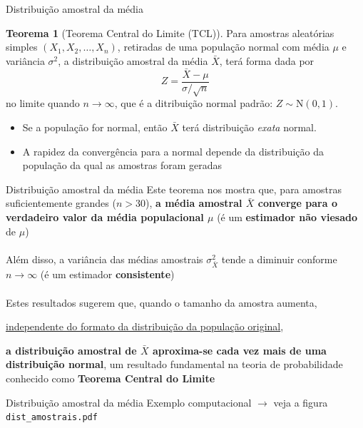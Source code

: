 \documentclass[10pt]{beamer}\usepackage[]{graphicx}\usepackage[]{color}
\providecommand{\N}{\text{N}}
\theoremstyle{definition}
\newtheorem*{mythm}{Teorema}
\begin{document}
\begin{frame}[fragile=singleslide]{Distribuição amostral da média}
  \begin{mythm}[Teorema Central do Limite (TCL)]
    Para amostras aleatórias simples $(X_1, X_2, \ldots, X_n)$,
    retiradas de uma população normal com média $\mu$ e variância
    $\sigma^2$, a distribuição amostral da média $\bar{X}$,
    terá forma dada por
    \begin{equation*}
      Z = \frac{\bar{X} - \mu}{\sigma/\sqrt{n}}
    \end{equation*}
    no limite quando $n \to \infty$, que é a ditribuição normal padrão:
    $Z \sim \N(0,1)$.
  \end{mythm}
  \begin{itemize}
  \item Se a população for normal, então $\bar{X}$ terá distribuição
    \textit{exata} normal.
  \item A rapidez da convergência para a normal depende da distribuição
    da população da qual as amostras foram geradas
  \end{itemize}
\end{frame}


\begin{frame}[fragile=singleslide]{Distribuição amostral da média}
  Este teorema nos mostra que, para amostras suficientemente grandes ($n
  > 30$), \textbf{a média amostral $\bar{X}$  converge para o verdadeiro
  valor da média populacional $\mu$} (é um \textbf{estimador
  não viesado} de $\mu$) \\~\\
  Além disso, a variância das médias amostrais $\sigma^2_{\bar{X}}$
  tende a diminuir conforme $n \rightarrow \infty$ (é um estimador
  \textbf{consistente}) \\~\\
  Estes resultados sugerem que, quando o tamanho da amostra aumenta,
  \begin{center}
  \underline{independente do formato da distribuição da população
    original},
  \end{center}
  \textbf{a distribuição amostral de $\bar{X}$ aproxima-se
    cada vez mais de uma distribuição normal}, um resultado fundamental
  na teoria de probabilidade conhecido como \textbf{Teorema Central do Limite}
\end{frame}

\begin{frame}{Distribuição amostral da média}
Exemplo computacional $\rightarrow$ veja a figura
\texttt{dist\_amostrais.pdf}
\end{frame}
\end{document}
